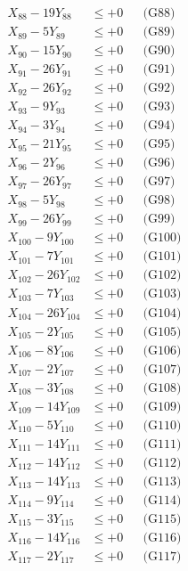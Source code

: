 \documentclass[a4paper,10pt]{article}
\begin{document}
{\begin{align}
\allowbreak
X_{88} - 19Y_{88} &\leq +0 && \text{(G88)} \\
X_{89} - 5Y_{89} &\leq +0 && \text{(G89)} \\
X_{90} - 15Y_{90} &\leq +0 && \text{(G90)} \\
X_{91} - 26Y_{91} &\leq +0 && \text{(G91)} \\
X_{92} - 26Y_{92} &\leq +0 && \text{(G92)} \\
X_{93} - 9Y_{93} &\leq +0 && \text{(G93)} \\
X_{94} - 3Y_{94} &\leq +0 && \text{(G94)} \\
X_{95} - 21Y_{95} &\leq +0 && \text{(G95)} \\
X_{96} - 2Y_{96} &\leq +0 && \text{(G96)} \\
X_{97} - 26Y_{97} &\leq +0 && \text{(G97)} \\
\allowbreak
X_{98} - 5Y_{98} &\leq +0 && \text{(G98)} \\
X_{99} - 26Y_{99} &\leq +0 && \text{(G99)} \\
X_{100} - 9Y_{100} &\leq +0 && \text{(G100)} \\
X_{101} - 7Y_{101} &\leq +0 && \text{(G101)} \\
X_{102} - 26Y_{102} &\leq +0 && \text{(G102)} \\
X_{103} - 7Y_{103} &\leq +0 && \text{(G103)} \\
X_{104} - 26Y_{104} &\leq +0 && \text{(G104)} \\
X_{105} - 2Y_{105} &\leq +0 && \text{(G105)} \\
X_{106} - 8Y_{106} &\leq +0 && \text{(G106)} \\
X_{107} - 2Y_{107} &\leq +0 && \text{(G107)} \\
\allowbreak
X_{108} - 3Y_{108} &\leq +0 && \text{(G108)} \\
X_{109} - 14Y_{109} &\leq +0 && \text{(G109)} \\
X_{110} - 5Y_{110} &\leq +0 && \text{(G110)} \\
X_{111} - 14Y_{111} &\leq +0 && \text{(G111)} \\
X_{112} - 14Y_{112} &\leq +0 && \text{(G112)} \\
X_{113} - 14Y_{113} &\leq +0 && \text{(G113)} \\
X_{114} - 9Y_{114} &\leq +0 && \text{(G114)} \\
X_{115} - 3Y_{115} &\leq +0 && \text{(G115)} \\
X_{116} - 14Y_{116} &\leq +0 && \text{(G116)} \\
X_{117} - 2Y_{117} &\leq +0 && \text{(G117)} \\

\end{align}}
\end{document}
